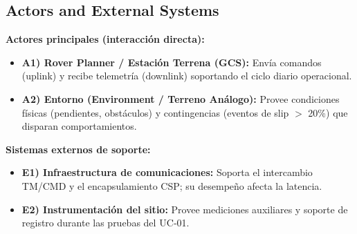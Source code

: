 \subsection{Actors and External Systems}\label{subsec:actors_systems}

\textbf{Actores principales (interacción directa):}
\begin{itemize}
    \item \textbf{A1) Rover Planner / Estación Terrena (GCS):} Envía comandos (uplink) y recibe telemetría (downlink) soportando el ciclo diario operacional. \cite{segoldmine_ppi, omg_sysml_mbse, nasa_cm}  
    \item \textbf{A2) Entorno (Environment / Terreno Análogo):} Provee condiciones físicas (pendientes, obstáculos) y contingencias (eventos de slip $>$ 20\%) que disparan comportamientos. \cite{nasa_cm, segoldmine_ppi, omg_sysml_mbse}  
\end{itemize}

\textbf{Sistemas externos de soporte:}
\begin{itemize}
    \item \textbf{E1) Infraestructura de comunicaciones:} Soporta el intercambio TM/CMD y el encapsulamiento CSP; su desempeño afecta la latencia. \cite{omg_sysml_mbse, nasa_cm, segoldmine_ppi}  
    \item \textbf{E2) Instrumentación del sitio:} Provee mediciones auxiliares y soporte de registro durante las pruebas del UC‑01. \cite{segoldmine_ppi, omg_sysml_mbse} 
\end{itemize}
